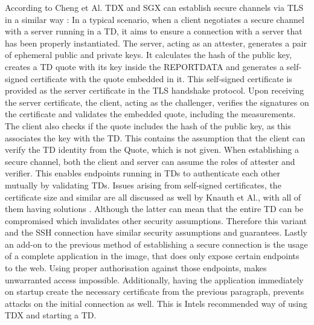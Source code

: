 According to Cheng et Al. TDX and SGX can establish secure channels via TLS in a similar way \cite{cheng_intel_2023}:
In a typical scenario, when a client negotiates a secure channel with a server running in a TD, it aims to ensure a connection with a server that has been properly instantiated. The server, acting as an attester, generates a pair of ephemeral public and private keys. It calculates the hash of the public key, creates a TD quote with its key inside the REPORTDATA and generates a self-signed certificate with the quote embedded in it. This self-signed certificate is provided as the server certificate in the TLS handshake protocol. Upon receiving the server certificate, the client, acting as the challenger, verifies the signatures on the certificate and validates the embedded quote, including the measurements. The client also checks if the quote includes the hash of the public key, as this associates the key with the TD. This contains the assumption that the client can verify the TD identity from the Quote, which is not given. When establishing a secure channel, both the client and server can assume the roles of attester and verifier. This enables endpoints running in TDs to authenticate each other mutually by validating TDs. Issues arising from self-signed certificates, the certificate size and similar are all discussed as well by Knauth et Al., with all of them having solutions \cite{knauth_integrating_2019}. Although the latter can mean that the entire TD can be compromised which invalidates other security assumptions. Therefore this variant and the SSH connection have similar security assumptions and guarantees.
Lastly an add-on to the previous method of establishing a secure connection is the usage of a complete application in the image, that does only expose certain endpoints to the web. Using proper authorisation against those endpoints, makes unwarranted access impossible. Additionally, having the application immediately on startup create the necessary certificate from the previous paragraph, prevents attacks on the initial connection as well. This is Intels recommended way of using TDX and starting a TD. 


